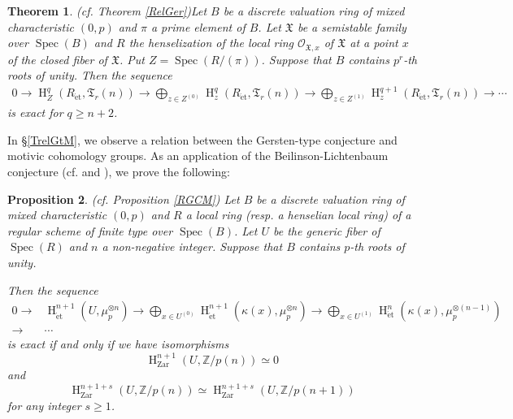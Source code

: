 \documentclass{article}
\newtheorem{thm}{\indent \sc Theorem}[section]
\newtheorem{prop}[thm]{\indent \sc Proposition}
\newcommand{\spec}{\operatorname{Spec}}
\newcommand{\et}{\mathrm{\acute{e}t}}
\newcommand{\Zar}{\mathrm{Zar}}
\newcommand{\HO}{\operatorname{H}}
\begin{document}
%
\begin{thm}\upshape(cf. Theorem \ref{RelGer})\label{Intrelsupp}
Let $B$ be a discrete valuation ring of mixed characteristic $(0, p)$
and $\pi$ a prime element of $B$. Let $\mathfrak{X}$ be a semistable
family over $\spec(B)$ and $R$ the henselization of the local ring $\mathcal{O}_{\mathfrak{X}, x}$ of $\mathfrak{X}$ at a 
point $x$ of the closed fiber of $\mathfrak{X}$.
Put $Z=\spec(R/(\pi))$.
Suppose that $B$ contains $p^{r}$-th roots of unity.
Then the sequence
%
\begin{align*}
0\to 
\HO_{Z}^{q}(R_{\et}, \mathfrak{T}_{r}(n))
\to
\displaystyle\bigoplus_{z\in Z^{(0)}}
\HO_{z}^{q}(R_{\et}, \mathfrak{T}_{r}(n))
\to
\displaystyle\bigoplus_{z\in Z^{(1)}}
\HO_{z}^{q+1}(R_{\et}, \mathfrak{T}_{r}(n))
\to
\cdots
\end{align*}
%
is exact for $q\geq n+2$.
\end{thm}
%

In \S \ref{TrelGtM}, we observe a relation between the Gersten-type conjecture and
motivic cohomology groups. 
As an application of the Beilinson-Lichtenbaum conjecture (cf. \cite[p.774, Theorem 1.2.2]{Ge} and \cite{V2}), 
we prove the following:

%
\begin{prop}\upshape\label{InrelGerMot}(cf. Proposition \ref{RGCM})
Let $B$ be a discrete valuation ring 
of mixed characteristic $(0, p)$
and $R$ a local ring 
(resp. a henselian local ring)
of a regular scheme of finite type over $\spec(B)$.
Let $U$ be the generic fiber of $\spec(R)$ and $n$ a non-negative integer.
Suppose that $B$ contains $p$-th roots of unity. 

Then the sequence
%
\begin{align}\label{InUet}
0\to& 
\HO^{n+1}_{\et}(U, \mu_{p}^{\otimes n})
\to
\displaystyle\bigoplus_{x\in U^{(0)}}
\HO^{n+1}_{\et}(
\kappa(x),
\mu_{p}^{\otimes n}
)
\to
\displaystyle\bigoplus_{x\in U^{(1)}}
\HO^{n}_{\et}(
\kappa(x),
\mu_{p}^{\otimes (n-1)}
) \nonumber
\\
\to&\cdots
\end{align}
%
is exact 
if and only if
we have isomorphisms
%
\begin{equation*}
\HO^{n+1}_{\Zar}(U, \mathbb{Z}/p(n))
\simeq 
0
\end{equation*}
%
and
%
\begin{equation*}
\HO^{n+1+s}_{\Zar}(
U,
\mathbb{Z}/p(n)
)    
\simeq
\HO^{n+1+s}_{\Zar}(
U,
\mathbb{Z}/p(n+1)
)
\end{equation*}
%
for any integer $s\geq 1$. 
\end{prop}
%
\end{document}
